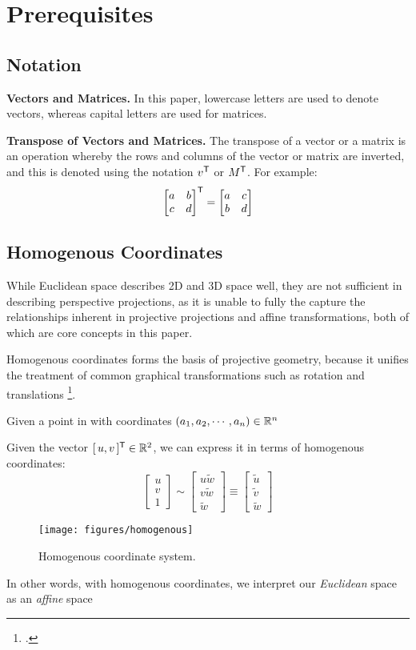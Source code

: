 \section{Prerequisites}

\subsection{Notation}
\noindent\textbf{Vectors and Matrices.} In this paper, lowercase letters are used to denote vectors, whereas capital letters are used for matrices. 

\noindent\textbf{Transpose of Vectors and Matrices.} The transpose of a vector or a matrix is an operation whereby the rows and columns of the vector or matrix are inverted, and this is denoted using the notation $v^{\mathsf{T}}$ or $M^{\mathsf{T}}$. For example:
\[
    \begin{bmatrix}
        a & b \\
        c & d
    \end{bmatrix}^{\mathsf{T}}
    =
    \begin{bmatrix}
        a & c \\
        b & d
    \end{bmatrix}
\]

\subsection{Homogenous Coordinates} \label{sec:homogenous}

While Euclidean space describes 2D and 3D space well, they are not sufficient in describing perspective projections, as it is unable to fully the capture the relationships inherent in projective projections and affine transformations, both of which are core concepts in this paper. 

Homogenous coordinates forms the basis of projective geometry, because it unifies the treatment of common graphical transformations such as rotation and translations \footcite[][1]{bloomenthalHomogeneousCoordinates1994}. 

Given a point in with coordinates $(a_1, a_2, \cdots, a_n) \in \mathbb{R}^n$ 



Given the vector $[\,u, v\,]^{\mathsf{T}} \in \mathbb{R}^2$, we can express it in terms of homogenous coordinates: 
\begin{equation}
    \begin{bmatrix}
        u \\ v \\ 1
    \end{bmatrix}
    \sim
    \begin{bmatrix}
        u\widetilde{w} \\ v\widetilde{w} \\ \widetilde{w}
    \end{bmatrix}
    \equiv
    \begin{bmatrix}
        \widetilde{u} \\ \widetilde{v} \\ \widetilde{w}
    \end{bmatrix}
\end{equation}

\begin{figure}[H]
    \centering
    \texttt{[image: figures/homogenous]}
    \caption{Homogenous coordinate system.}
\end{figure}

In other words, with homogenous coordinates, we interpret our \emph{Euclidean} space as an \emph{affine} space
